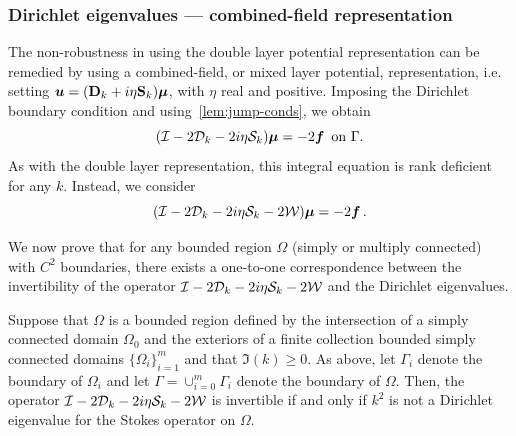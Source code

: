 \subsubsection{Dirichlet eigenvalues --- combined-field representation}
\label{subsec:mixedanalysis}

The non-robustness in using the double layer
potential representation can be
remedied by using a combined-field, or mixed layer potential,
representation, i.e. setting ${\boldsymbol u} = ({\bf D}_{k} + i\eta {\bf S}_{k})
{\boldsymbol \mu}$, with $\eta$ real and positive.
Imposing the Dirichlet boundary condition
and using~\cref{lem:jump-conds}, we obtain 
\begin{equation}
  (\mathcal I - 2{\mathcal D}_{k} - 2i\eta {\mathcal S}_{k}) {\boldsymbol \mu} = -2 {\boldsymbol f} \,
  \textrm{ on } \Gamma. 
\end{equation}
As with the double layer representation, this
integral equation is rank deficient for any $k$.
Instead, we consider
\begin{equation}
(\mathcal I - 2{\mathcal D}_{k} -2i\eta {\mathcal S}_{k}  -2{\mathcal W}){\boldsymbol \mu} = -2 {\boldsymbol f} \, .
\end{equation}

We now prove that for any bounded region $\Omega$
(simply or multiply connected) with $C^{2}$ boundaries,
there exists a one-to-one correspondence between the
invertibility of the operator $\mathcal I - 2{\mathcal D}_{k}
- 2i\eta {\mathcal S}_{k} - 2{\mathcal W}$ and the Dirichlet eigenvalues.

\begin{theorem}
  \label{thm:cfmain}
  Suppose that $\Omega$ is a bounded region defined
  by the intersection of a simply connected domain $\Omega_{0}$
  and the exteriors of a finite collection bounded simply
  connected domains $\{ \Omega_{i} \}_{i=1}^{m}$ {\color{red}
    and that $\Im (k) \geq 0$}. As above,
  let $\Gamma_{i}$ denote the boundary of $\Omega_{i}$ and let
  $\Gamma = \cup_{i=0}^{m} \Gamma_{i}$ denote the boundary of
  $\Omega$. Then, the operator $\mathcal I - 2{\mathcal D}_{k} - 2i\eta {\mathcal S}_{k}
  - 2{\mathcal W}$ is invertible if and only if $k^2$ is not a Dirichlet
  eigenvalue for the Stokes operator on $\Omega$.
\end{theorem}

